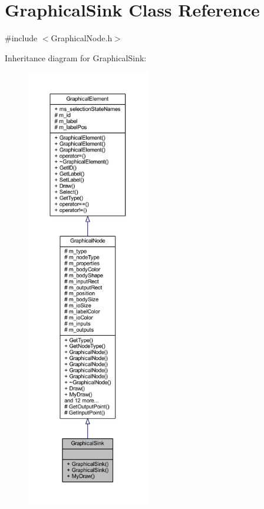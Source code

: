 \hypertarget{class_graphical_sink}{}\section{Graphical\+Sink Class Reference}
\label{class_graphical_sink}


{\ttfamily \#include $<$Graphical\+Node.\+h$>$}



Inheritance diagram for Graphical\+Sink\+:
\nopagebreak
\begin{figure}[H]
\begin{center}
\leavevmode
\includegraphics[height=550pt]{class_graphical_sink__inherit__graph}
\end{center}
\end{figure}


